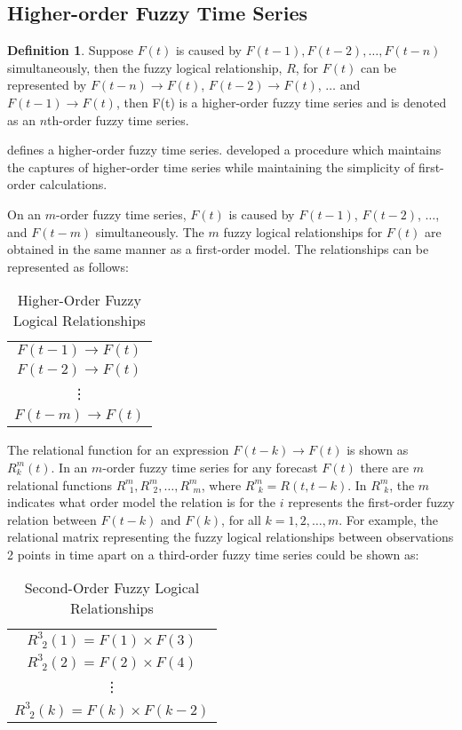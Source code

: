 \documentclass{article}
\theoremstyle{definition}
\newtheorem{ftsdef}{Definition}
\begin{document}
\subsection{Higher-order Fuzzy Time Series}

\begin{ftsdef}
\label{def5}
Suppose $F(t)$ is caused by $F(t-1),F(t-2),\ldots,F(t-n)$ simultaneously, then the fuzzy logical relationship, $R$, for $F(t)$ can be represented by $F(t-n)\rightarrow F(t)$, $F(t-2) \rightarrow F(t)$, $\ldots$ and $F(t-1) \rightarrow F(t)$, then F(t) is a higher-order fuzzy time series and is denoted as an $n$th-order fuzzy time series.
\end{ftsdef}

 defines a higher-order fuzzy time series. \cite{tsai1999study} developed a procedure which maintains the captures of higher-order time series while maintaining the simplicity of first-order calculations.

On an $m$-order fuzzy time series, $F(t)$ is caused by $F(t-1)$, $F(t-2)$, $\ldots$, and $F(t-m)$ simultaneously. The $m$ fuzzy logical relationships for $F(t)$ are obtained in the same manner as a first-order model. The relationships can be represented as follows:

\begin{table}[H]
	\center
	\begin{tabular}{ c }
  	$F(t-1) \rightarrow F(t)$ \\
  	$F(t-2) \rightarrow F(t)$ \\
  	\vdots \\
  	$F(t-m) \rightarrow F(t)$ \\
	\end{tabular}
	\caption{Higher-Order Fuzzy Logical Relationships}
\end{table}

The relational function for an expression $F(t-k) \rightarrow F(t)$ is shown as $R^{m}_{k}(t)$. In an $m$-order fuzzy time series for any forecast $F(t)$ there are $m$ relational functions $R^{m}_{\ \ 1}, R^{m}_{\ \ 2}, \ldots, R^{m}_{\ \ m}$, where $R^{m}_{\ \ k}=R(t,t-k)$. In $R^{m}_{\ \ k}$, the $m$ indicates what order model the relation is for the $i$ represents the first-order fuzzy relation between $F(t-k)$ and $F(k)$, for all $k={1,2,\ldots,m}$. For example, the relational matrix representing the fuzzy logical relationships between observations 2 points in time apart on a third-order fuzzy time series could be shown as:

\begin{table}[H]
	\center
	\begin{tabular}{ c }
  	$R^{3}_{\ \ 2}(1) = F(1) \times F(3)$ \\
  	$R^{3}_{\ \ 2}(2) = F(2) \times F(4)$ \\
  	\vdots \\
  	$R^{3}_{\ \ 2}(k) = F(k) \times F(k-2)$ \\
	\end{tabular}
	\caption{Second-Order Fuzzy Logical Relationships}
	\label{second-order-rels}
\end{table}
\end{document}
